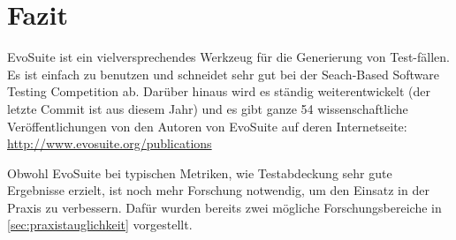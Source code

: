 \documentclass[a4paper,11pt]{article}
\begin{document}
\section{Fazit}

EvoSuite ist ein vielversprechendes Werkzeug für die Generierung von Test-fällen.
Es ist einfach zu benutzen und schneidet sehr gut bei der Seach-Based Software Testing Competition ab.
Darüber hinaus wird es ständig weiterentwickelt (der letzte Commit ist aus diesem Jahr) und es gibt ganze 54 wissenschaftliche Veröffentlichungen von den Autoren von EvoSuite auf deren Internetseite: \url{http://www.evosuite.org/publications}

Obwohl EvoSuite bei typischen Metriken, wie Testabdeckung sehr gute Ergebnisse erzielt, ist noch mehr Forschung notwendig, um den Einsatz in der Praxis zu verbessern.
Dafür wurden bereits zwei mögliche Forschungsbereiche in \cref{sec:praxistauglichkeit} vorgestellt.



\end{document}
